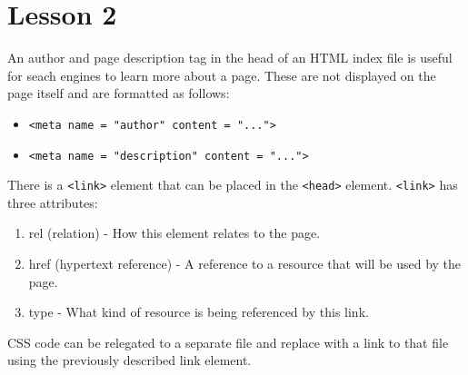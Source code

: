 \documentclass{article}
\begin{document}
\section{Lesson 2} \label{sec:L2}
An author and page description tag in the head of an HTML index file is useful for seach engines to learn more about a page. These are not
displayed on the page itself and are formatted as follows:
\begin{itemize}
    \item \verb|<meta name = "author" content = "...">|
    \item \verb|<meta name = "description" content = "...">|
\end{itemize}
There is a \verb|<link>| element that can be placed in the \verb|<head>| element. \verb|<link>| has three attributes:
\begin{enumerate}
    \item rel (relation) - How this element relates to the page.
    \item href (hypertext reference) - A reference to a resource that will be used by the page.
    \item type - What kind of resource is being referenced by this link.
\end{enumerate}
CSS code can be relegated to a separate file and replace with a link to that file using the previously described link element.
\end{document}
